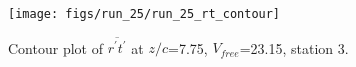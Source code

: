 \begin{figure}[H]
\centering
\texttt{[image: figs/run\_25/run\_25\_rt\_contour]}
\caption{Contour plot of $\overline{r^\prime t^\prime}$ at $z/c$=7.75, $V_{free}$=23.15, station 3.}
\label{fig:run_25_rt_contour}
\end{figure}


